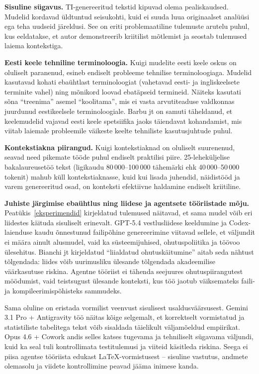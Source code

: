 \textbf{Sisuline sügavus.} TI-genereeritud tekstid kipuvad olema pealiskaudsed. Mudelid kordavad üldtuntud seisukohti, kuid ei suuda luua originaalset analüüsi ega teha uudseid järeldusi. See on eriti problemaatiline tulemuste arutelu puhul, kus eeldatakse, et autor demonstreerib kriitilist mõtlemist ja seostab tulemused laiema kontekstiga.

\textbf{Eesti keele tehniline terminoloogia.} Kuigi mudelite eesti keele oskus on oluliselt paranenud, esineb endiselt probleeme tehnilise terminoloogiaga. Mudelid kasutavad kohati ebaühtlast terminoloogiat (vahetavad eesti- ja ingliskeelsete terminite vahel) ning mõnikord loovad ebatäpseid termineid. Näiteks kasutati sõna ``treenima'' asemel ``koolitama'', mis ei vasta arvutiteaduse valdkonnas juurdunud eestikeelsele terminoloogiale. Barbu jt \cite{barbu2025estonian} on samuti täheldanud, et keelemudelid vajavad eesti keele spetsiifika jaoks täiendavat kohandamist, mis viitab laiemale probleemile väikeste keelte tehniliste kasutusjuhtude puhul.

\textbf{Kontekstiakna piirangud.} Kuigi kontekstiaknad on oluliselt suurenenud, seavad need pikemate tööde puhul endiselt praktilisi piire. 25-leheküljelise bakalaureusetöö tekst (ligikaudu 80\,000--100\,000 tähemärki ehk 40\,000--50\,000 tokenit) mahub küll kontekstiaknasse, kuid kui lisada juhendid, näidistööd ja varem genereeritud osad, on konteksti efektiivne haldamine endiselt kriitiline.

\textbf{Juhiste järgimise ebaühtlus ning liidese ja agentsete tööriistade mõju.} Peatükis~\ref{eksperimendid} kirjeldatud tulemused näitavad, et sama mudel võib eri liidestes käituda sisuliselt erinevalt. GPT-5.4 vestlusliidese keeldumine ja Codex-laienduse kaudu õnnestunud failipõhine genereerimine viitavad sellele, et väljundit ei määra ainult alusmudel, vaid ka süsteemijuhised, ohutuspoliitika ja töövoo ülesehitus. Bianchi jt \cite{bianchi2023safety} kirjeldatud ``liialdatud ohutuskäitumine'' aitab seda nähtust tõlgendada: liides võib uurimusliku ülesande tõlgendada akadeemilise väärkasutuse riskina. Agentne tööriist ei tähenda seejuures ohutuspiirangutest möödumist, vaid teistsugust ülesande konteksti, kus töö jaotub väiksemateks faili- ja kompileerimispõhisteks sammudeks.

Sama oluline on eristada vormilist veenvust sisulisest usaldusväärsusest. Gemini 3.1 Pro + Antigravity töö näitas kõige selgemalt, et korrektselt vormistatud ja statistiliste tabelitega tekst võib sisaldada täielikult väljamõeldud empiirikat. Opus 4.6 + Cowork andis selles katses tugevama ja tehniliselt sügavama väljundi, kuid ka seal tuli kontrollimata testitulemusi ja viiteid käsitleda riskina. Seega ei piisa agentse tööriista edukast \LaTeX{}-vormistusest -- sisuline vastutus, andmete olemasolu ja viidete kontrollimine peavad jääma inimese kanda.

